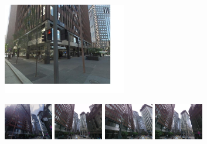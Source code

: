     \begin{figure}[h]
      \begin{minipage}{1.0\linewidth}
      \end{minipage}
      \begin{minipage}{0.34\linewidth}
          \centering
          \vspace{5mm}
          \hspace{5mm}\includegraphics[height=40mm]{imgs/ex1/query.jpg}
      \end{minipage}
      \begin{minipage}{0.75\linewidth}
          \begin{minipage}{\linewidth} 
              \colorbox{myGreen}{\includegraphics[height=16mm]{imgs/ex1/FVsvm1.jpg}}
              \colorbox{myGreen}{\includegraphics[height=16mm]{imgs/ex1/FVsvm2.jpg}}
              \colorbox{myGreen}{\includegraphics[height=16mm]{imgs/ex1/FVsvm3.jpg}}
              \colorbox{myGreen}{\includegraphics[height=16mm]{imgs/ex1/FVsvm4.jpg}}
          \end{minipage}
          \\
          \begin{minipage}{\linewidth}

\end{minipage}
\end{minipage}
\end{figure}
